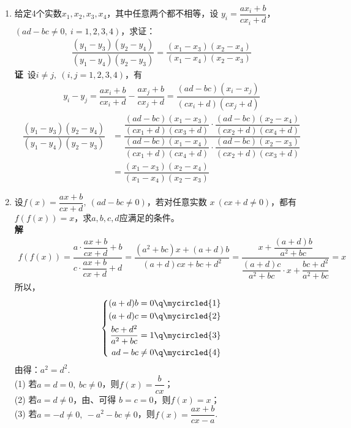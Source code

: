 \begin{enumerate}[label={【\textbf{例\thechapter.\arabic*}】},
 leftmargin=\inteval{\myenumleftmargin}pt,
 itemsep=\inteval{\myenumitempsep}pt,
 itemindent=\inteval{\myenumitemindent}pt]
此题的背景是：
\begin{gather*}
    \dfrac{1}{\lambda}\cos(x+y)+\dfrac{1}{\lambda}\cos(x-y)=
    \dfrac{2}{\lambda}\cos x\cos y=
    2\lambda\left(\dfrac{1}{\lambda}\cos x\right)
    \left(\dfrac{1}{\lambda}\cos y\right)
\end{gather*}
即$ \dfrac{1}{\lambda}\cos x $满足函数方程$ f(x+y)+f(x-y)=2\lambda f(x)f(y) $. 

\item \label{分式线性变换保交比例题}
给定4个实数$ x_1,x_2,x_3,x_4 $，其中任意两个都不相等，设
$ y_i=\dfrac{ax_i+b}{cx_i+d} $，$ (ad-bc\neq 0,\ i=1,2,3,4) $，求证：
\begin{gather}\label{分式线性变换保交比}
    \dfrac{(y_1-y_3)(y_2-y_4)}{(y_1-y_4)(y_2-y_3)}=
    \dfrac{(x_1-x_3)(x_2-x_4)}{(x_1-x_4)(x_2-x_3)}
\end{gather}
\textbf{证}\ 设$ i\neq j,\ (i,j=1,2,3,4) $，有
\begin{gather*}
    y_i-y_j=\dfrac{ax_i+b}{cx_i+d}-\dfrac{ax_j+b}{cx_j+d}=
    \dfrac{(ad-bc)(x_i-x_j)}{(cx_i+d)(cx_j+d)}
\end{gather*}
\begin{align*}
    \dfrac{(y_1-y_3)(y_2-y_4)}{(y_1-y_4)(y_2-y_3)} &=
    \dfrac{\dfrac{(ad-bc)(x_1-x_3)}{(cx_1+d)(cx_3+d)}\cdot
        \dfrac{(ad-bc)(x_2-x_4)}{(cx_2+d)(cx_4+d)}}{
        \dfrac{(ad-bc)(x_1-x_4)}{(cx_1+d)(cx_4+d)}\cdot
        \dfrac{(ad-bc)(x_2-x_3)}{(cx_2+d)(cx_3+d)} } \\
    &=\dfrac{(x_1-x_3)(x_2-x_4)}{(x_1-x_4)(x_2-x_3)}
\end{align*}

\item 设$ f(x)=\dfrac{ax+b}{cx+d},\ (ad-bc\neq 0) $，若对任意实数
$ x\ (cx+d\neq 0) $，都有$ f(f(x))=x $，求$ a,b,c,d $应满足的条件。\\
\textbf{解}\ 
\begin{gather*}
    f(f(x))=\dfrac{a\cdot\dfrac{ax+b}{cx+d}+b}{c\cdot
        \dfrac{ax+b}{cx+d}+d}=
    \dfrac{(a^2+bc)x+(a+d)b}{(a+d)cx+bc+d^2}=
    \dfrac{x+\dfrac{(a+d)b}{a^2+bc}}{\dfrac{(a+d)c}{a^2+bc}
        \cdot x+ \dfrac{bc+d^2}{a^2+bc}}=x
\end{gather*}
所以，
\begin{align*}
    \left\{
    \begin{aligned}
        (a+d)b=0\q  & \mycircled{1} \\
        (a+d)c=0\q  & \mycircled{2} \\
        \dfrac{bc+d^2}{a^2+bc}=1\q  & \mycircled{3} \\
        ad-bc\neq 0\q  & \mycircled{4}
    \end{aligned}
    \right.
\end{align*}
由得：$ a^2=d^2 $. \\
(1) 若$ a=d=0,\ bc\neq 0 $，则$ f(x)=\dfrac{b}{cx} $；\\
(2) 若$ a=d\neq 0 $，由、可得
$ b=c=0 $，则$ f(x)=x $；\\
(3) 若$ a=-d\neq 0,\ -a^2-bc\neq 0 $，则$ f(x)=\dfrac{ax+b}{cx-a} $.


\end{enumerate}
